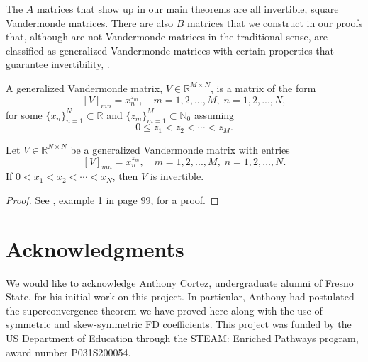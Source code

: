 \documentclass[12pt]{article}
\newcommand{\N}{\mathbb{N}}
\newcommand{\R}{\mathbb{R}}
\begin{document}
The $A$ matrices that show up in our main theorems are all invertible, square Vandermonde matrices.
There are also $B$ matrices that we construct in our proofs that, although are not Vandermonde matrices in the traditional sense, are classified as generalized Vandermonde matrices with certain properties that guarantee invertibility, \cite{gantmacher1959,heineman1926}.

%
\begin{definition}\label{def:genVander}
A {generalized Vandermonde matrix}, $V\in\R^{M\times N}$, is a matrix of the form
\[
	[V]_{mn} = x_n^{z_m}, \quad m=1,2,...,M, \; n=1,2,...,N,
\]
for some $\{x_n\}_{n=1}^N\subset \R$ and $\{z_m\}_{m=1}^M\subset \N_0$ assuming
\[
	0\le z_1 < z_2 < \cdots < z_M.
\]
\end{definition}

%
\begin{lemma}\label{lem:genVander}
Let $V\in\R^{N\times N}$ be a generalized Vandermonde matrix with entries
\[
	[V]_{mn} = x_n^{z_m}, \quad m=1,2,...,M, \; n=1,2,...,N.
\] 
If $0<x_1 < x_2 < \cdots < x_N$, then $V$ is invertible.
\end{lemma}
%
\begin{proof}
See \cite{gantmacher1959}, example 1 in page 99, for a proof.
\end{proof}


\section*{Acknowledgments} 
 
 We would like to acknowledge Anthony Cortez, undergraduate alumni of Fresno State, for his initial work on this project.
In particular, Anthony had postulated the superconvergence theorem we have proved here along with the use of symmetric and skew-symmetric FD coefficients.
This project was funded by the US Department of Education through the STEAM: Enriched Pathways program, award number P031S200054.
\end{document}
